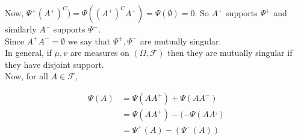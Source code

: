 \documentclass[11pt,fleqn]{book} %
\begin{document}
Now, $\Psi^+(A^+)^C) = \Psi((A^+)^CA^+) = \Psi(\emptyset) = 0$. So $A^+$ supports $\Psi^+$ and similarly $A^- $ supports $\Psi^-$.\\

Since $A^+A^- = \emptyset$ we say that $\Psi^+, \Psi^-$ are mutually singular. \\

In general, if $\mu, v$ are measures on $(\Omega, \mathcal{F})$ then they are mutually singular if they have disjoint support. \\

Now, for all $A \in \mathcal{F}$, 

		\begin{align*}
			\Psi(A) &= \Psi(A A^+) + \Psi(AA^-)\\
				&= \Psi(AA^+) - (-\Psi(AA^_))\\
				&= \Psi^+ (A) - (\Psi^-(A))
		\end{align*}














\end{document}
